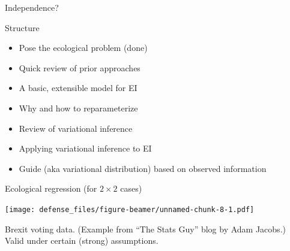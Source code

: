 \documentclass[ignorenonframetext,]{beamer}
\providecommand{\tightlist}{%
\setlength{\itemsep}{0pt}\setlength{\parskip}{0pt}}
\newcommand{\red}[1]{\textcolor{red}{#1}}
\newcommand{\look}[1]{\textcolor{purple}{#1}}
\begin{document}
\begin{frame}{Independence?}


\end{frame}

\begin{frame}{Structure}

\begin{itemize}
\tightlist
\item
  Pose the ecological problem (done)
\item
  Quick review of prior approaches
\item
  A basic, extensible model for EI
\item
  Why and how to reparameterize
\item
  Review of variational inference
\item
  Applying variational inference to EI
\item
  Guide (aka variational distribution) based on observed information
\end{itemize}

\end{frame}

\begin{frame}{Ecological regression (for \(2\times 2\) cases)}

\texttt{[image: defense\_files/figure-beamer/unnamed-chunk-8-1.pdf]}

Brexit voting data. (Example from ``The Stats Guy'' blog by Adam
Jacobs.) Valid under certain (strong) assumptions.

\end{frame}
\end{document}
